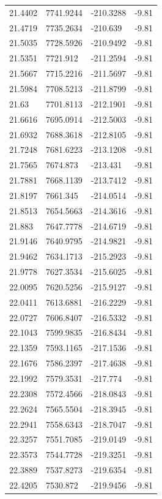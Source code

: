 \begin{table}[H]
\begin{tabular}{llll}
21.4402 & 7741.9244 & -210.3288 & -9.81 \\
21.4719 & 7735.2634 & -210.639 & -9.81 \\
21.5035 & 7728.5926 & -210.9492 & -9.81 \\
21.5351 & 7721.912 & -211.2594 & -9.81 \\
21.5667 & 7715.2216 & -211.5697 & -9.81 \\
21.5984 & 7708.5213 & -211.8799 & -9.81 \\
21.63 & 7701.8113 & -212.1901 & -9.81 \\
21.6616 & 7695.0914 & -212.5003 & -9.81 \\
21.6932 & 7688.3618 & -212.8105 & -9.81 \\
21.7248 & 7681.6223 & -213.1208 & -9.81 \\
21.7565 & 7674.873 & -213.431 & -9.81 \\
21.7881 & 7668.1139 & -213.7412 & -9.81 \\
21.8197 & 7661.345 & -214.0514 & -9.81 \\
21.8513 & 7654.5663 & -214.3616 & -9.81 \\
21.883 & 7647.7778 & -214.6719 & -9.81 \\
21.9146 & 7640.9795 & -214.9821 & -9.81 \\
21.9462 & 7634.1713 & -215.2923 & -9.81 \\
21.9778 & 7627.3534 & -215.6025 & -9.81 \\
22.0095 & 7620.5256 & -215.9127 & -9.81 \\
22.0411 & 7613.6881 & -216.2229 & -9.81 \\
22.0727 & 7606.8407 & -216.5332 & -9.81 \\
22.1043 & 7599.9835 & -216.8434 & -9.81 \\
22.1359 & 7593.1165 & -217.1536 & -9.81 \\
22.1676 & 7586.2397 & -217.4638 & -9.81 \\
22.1992 & 7579.3531 & -217.774 & -9.81 \\
22.2308 & 7572.4566 & -218.0843 & -9.81 \\
22.2624 & 7565.5504 & -218.3945 & -9.81 \\
22.2941 & 7558.6343 & -218.7047 & -9.81 \\
22.3257 & 7551.7085 & -219.0149 & -9.81 \\
22.3573 & 7544.7728 & -219.3251 & -9.81 \\
22.3889 & 7537.8273 & -219.6354 & -9.81 \\
22.4205 & 7530.872 & -219.9456 & -9.81 \\

\end{tabular}
\end{table}
